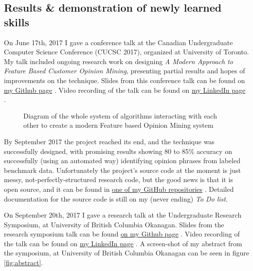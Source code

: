 \documentclass[12pt]{article} %
\begin{document}
\subsection{Results \& demonstration of newly learned skills} %
On June 17th, 2017 I gave a conference talk at the Canadian Undergraduate Computer Science Conference (CUCSC 2017), organized at University of Toronto. My talk included ongoing research work on designing \textit{A Modern Approach to Feature Based Customer Opinion Mining}, presenting partial results and hopes of improvements on the technique. Slides from this conference talk can be found on \href{https://github.com/norberte/Feature-Based-Opinion-Mining/blob/master/CUCSC\%202017\%20presentation.pdf}{my Github page} \cite{CUCSC_slides}. Video recording of the talk can be found on \href{https://www.linkedin.com/pulse/my-first-research-talk-conference-norbert-eke/}{my LinkedIn page} \cite{CUCSC}.

\begin{figure}[H]
\caption{Diagram of the whole system of algorithms interacting with each other to create a modern Feature based Opinion Mining system}
\label{fig:technique}
\end{figure}

By September 2017 the project reached its end, and the technique was successfully designed, with promising results showing 80 to 85\% accuracy on successfully (using an automated way) identifying opinion phrases from labeled benchmark data. Unfortunately the project's source code at the moment is just messy, not-perfectly-structured research code, but the good news is that it is open source, and it can be found in 
\href{https://github.com/norberte/Feature-Based-Opinion-Mining}{one of my GitHub repositories} \cite{GitHubFBOM}. Detailed documentation for the source code is still on my (never ending) \textit{To Do list}.

On September 20th, 2017 I gave a research talk at the Undergraduate Research Symposium, at University of British Columbia Okanagan. Slides from the research symposium talk can be found
\href{https://github.com/norberte/Feature-Based-Opinion-Mining/blob/master/URA\%20Presentation\%202017.pdf}{on my Github page} \cite{URA_slides}. Video recording of the talk can be found on \href{https://www.linkedin.com/pulse/feature-based-customer-opinion-mining-research-project-norbert-eke/}{my LinkedIn page} \cite{URA}. A screen-shot of my abstract from the symposium, at University of British Columbia Okanagan can be seen in figure \ref{fig:abstract}.
\end{document}
